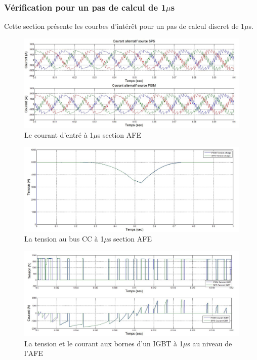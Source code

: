 \documentclass[11pt,letterpaper,final]{report}
\begin{document}
\subsubsection{Vérification pour un pas de calcul de 1$\mu$s}
Cette section présente les courbes d'intérêt pour un pas de calcul discret de 1$\mu$s. 

\begin{figure}[htb]
\centering
\includegraphics[scale=0.5]{Fig/DCP_AFE/1u/cour_al.jpg}
\caption{Le courant d'entré à 1$\mu$s section AFE}
\label{AF_DC_cou1}
\end{figure}


\begin{figure}[htb]
\centering
\includegraphics[scale=0.5]{Fig/DCP_AFE/1u/ten_bus.jpg}
\caption{La tension au bus CC à 1$\mu$s section AFE}
\label{AF_DC_vch1}
\end{figure}



\begin{figure}[htb]
\centering
\includegraphics[scale=0.5]{Fig/DCP_AFE/1u/IGBT_afe.jpg}
\caption{La tension et le courant aux bornes d'un IGBT à 1$\mu$s au niveau de l'AFE}
\label{AF_DC_IGBT1}
\end{figure}
\end{document}
